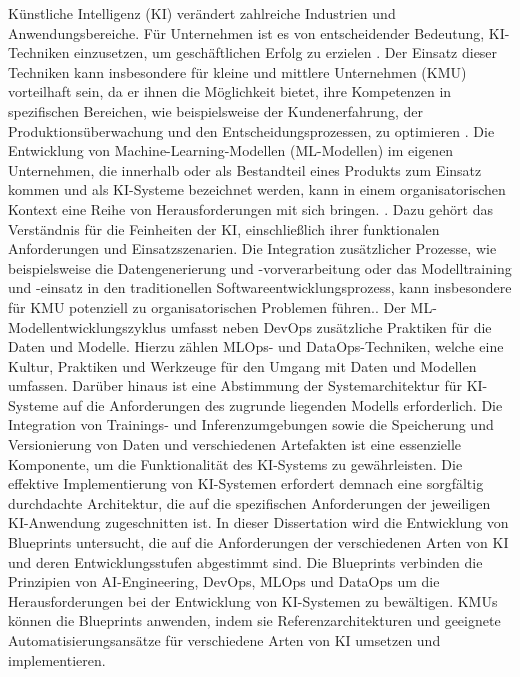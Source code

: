 \documentclass[11pt,a4paper,pointlessnumbers]{scrartcl}
\theoremstyle{break}
\numberwithin{equation}{section}
\begin{document}
Künstliche Intelligenz (KI) verändert zahlreiche Industrien und Anwendungsbereiche. Für Unternehmen ist es von entscheidender Bedeutung, KI-Techniken einzusetzen, um geschäftlichen Erfolg zu erzielen \cite{enholmArtificialIntelligenceBusiness2022, loureiroArtificialIntelligenceBusiness2021}. 
Der Einsatz dieser Techniken kann insbesondere für kleine und mittlere Unternehmen (KMU) vorteilhaft sein, da er ihnen die Möglichkeit bietet, ihre Kompetenzen in spezifischen Bereichen, wie beispielsweise der Kundenerfahrung, der Produktionsüberwachung und den Entscheidungsprozessen, zu optimieren \cite{bhaleraoStudyBarriersBenefits2022}.
Die Entwicklung von Machine-Learning-Modellen (ML-Modellen) im eigenen Unternehmen, die innerhalb oder als Bestandteil eines Produkts zum Einsatz kommen und als KI-Systeme bezeichnet werden, kann in einem organisatorischen Kontext eine Reihe von Herausforderungen mit sich bringen. \cite{fischerAISystemEngineering2020,lwakatareDevOpsAIChallenges2020,schonbergerArtificialIntelligenceSmall2023, nascimentoUnderstandingDevelopmentProcess2019}. 
Dazu gehört das Verständnis für die Feinheiten der KI, einschließlich ihrer funktionalen Anforderungen und Einsatzszenarien. Die Integration zusätzlicher Prozesse, wie beispielsweise die Datengenerierung und -vorverarbeitung oder das Modelltraining und -einsatz in den traditionellen Softwareentwicklungsprozess, kann insbesondere für KMU potenziell zu organisatorischen Problemen führen.\cite{schonbergerArtificialIntelligenceSmall2023}. 
Der ML-Modellentwicklungszyklus umfasst neben DevOps zusätzliche Praktiken für die Daten und Modelle. Hierzu zählen MLOps- und DataOps-Techniken, welche eine Kultur, Praktiken und Werkzeuge für den Umgang mit Daten und Modellen umfassen. 
Darüber hinaus ist eine Abstimmung der Systemarchitektur für KI-Systeme auf die Anforderungen des zugrunde liegenden Modells erforderlich. Die Integration von Trainings- und Inferenzumgebungen sowie die Speicherung und Versionierung von Daten und verschiedenen Artefakten ist eine essenzielle Komponente, um die Funktionalität des KI-Systems zu gewährleisten.
Die effektive Implementierung von KI-Systemen erfordert demnach eine sorgfältig durchdachte Architektur, die auf die spezifischen Anforderungen der jeweiligen KI-Anwendung zugeschnitten ist.
In dieser Dissertation wird die Entwicklung von Blueprints untersucht, die auf die Anforderungen der verschiedenen Arten von KI und deren Entwicklungsstufen abgestimmt sind. Die Blueprints verbinden die Prinzipien von AI-Engineering, DevOps, MLOps und DataOps um die Herausforderungen bei der Entwicklung von KI-Systemen zu bewältigen. KMUs können die Blueprints anwenden, indem sie Referenzarchitekturen und geeignete Automatisierungsansätze für verschiedene Arten von KI umsetzen und implementieren.
\end{document}
